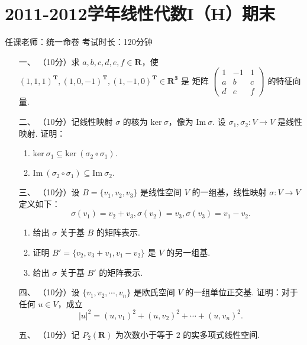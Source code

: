 \section*{2011-2012学年线性代数I（H）期末}

\begin{center}
    任课老师：统一命卷\hspace{4em} 考试时长：120分钟
\end{center}

\begin{enumerate}
    \item [一、]（10分）求 $a,b,c,d,e,f\in \mathbf{R}$，使 $(1,1,1)^\mathbf{T},(1,0,-1)^\mathbf{T},(1,-1,0)^\mathbf{T}\in \mathbf{R^3}$ 是
    矩阵 $\begin{pmatrix}1 & -1 & 1 \\ a & b & c \\ d & e & f\end{pmatrix}$ 的特征向量.
    \item [二、]（10分）记线性映射 $\sigma$ 的核为 $\mathrm{ker}\ \sigma$，像为 $\mathrm{Im}\ \sigma.$ 设 $\sigma_1,\sigma_2:V\to V$ 是线性映射. 证明：
    \begin{enumerate}[label=(\arabic*)]
        \item $\mathrm{ker}\ \sigma_1 \subseteq \mathrm{ker}\ (\sigma_2 \circ \sigma_1).$
        \item $\mathrm{Im}\ (\sigma_2 \circ \sigma_1) \subseteq \mathrm{Im}\ \sigma_2.$
    \end{enumerate}
    \item [三、]（10分）设 $B=\{v_1,v_2,v_3\}$ 是线性空间 $V$ 的一组基，线性映射 $\sigma:V\to V$ 定义如下：
    \[\sigma(v_1)=v_2+v_3,\sigma(v_2)=v_3,\sigma(v_3)=v_1-v_2.\]
    \begin{enumerate}[label=(\arabic*)]
        \item 给出 $\sigma$ 关于基 $B$ 的矩阵表示.
        \item 证明 $B'=\{v_2,v_3+v_1,v_1-v_2\}$ 是 $V$ 的另一组基.
        \item 给出 $\sigma$ 关于基 $B'$ 的矩阵表示.
    \end{enumerate}
    \item [四、]（10分）设 $\{v_1,v_2,\cdots,v_n\}$ 是欧氏空间 $V$ 的一组单位正交基. 证明：对于任何 $u\in V$，成立
    \[\lvert u \rvert^2 = (u,v_1)^2+(u,v_2)^2+\cdots+(u,v_n)^2.\] 
    \item [五、]（10分）记 $P_2(\mathbf{R})$ 为次数小于等于 $2$ 的实多项式线性空间.

\end{enumerate}
